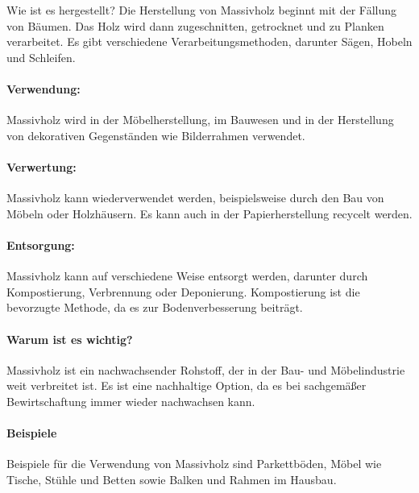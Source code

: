 \documentclass{article}
\begin{document}
\begin{multicols}{3}
Wie ist es hergestellt? Die Herstellung von Massivholz beginnt mit der Fällung
von Bäumen. Das Holz wird dann zugeschnitten, getrocknet und zu Planken
verarbeitet. Es gibt verschiedene Verarbeitungsmethoden, darunter Sägen, Hobeln
und Schleifen.

\paragraph{Verwendung:}
Massivholz wird in der Möbelherstellung, im Bauwesen und in der Herstellung von
dekorativen Gegenständen wie Bilderrahmen verwendet.

\paragraph{Verwertung:}
Massivholz kann wiederverwendet werden, beispielsweise durch den Bau von Möbeln
oder Holzhäusern. Es kann auch in der Papierherstellung recycelt werden.

\paragraph{Entsorgung:}
Massivholz kann auf verschiedene Weise entsorgt werden, darunter durch
Kompostierung, Verbrennung oder Deponierung. Kompostierung ist die bevorzugte
Methode, da es zur Bodenverbesserung beiträgt.

\paragraph{Warum ist es wichtig?}
Massivholz ist ein nachwachsender Rohstoff, der in der Bau- und Möbelindustrie
weit verbreitet ist. Es ist eine nachhaltige Option, da es bei sachgemäßer
Bewirtschaftung immer wieder nachwachsen kann.

\paragraph{Beispiele}
Beispiele für die Verwendung von Massivholz sind Parkettböden, Möbel wie
Tische, Stühle und Betten sowie Balken und Rahmen im Hausbau.


\end{multicols}
\end{document}
